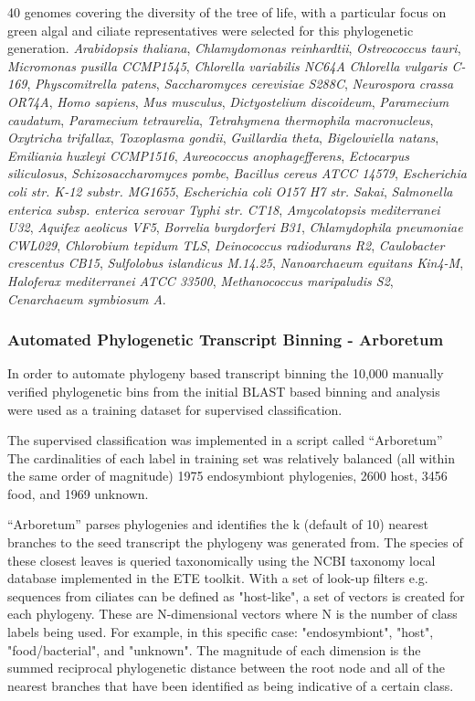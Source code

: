 40 genomes covering the diversity of the tree of life, with a particular focus on green algal and ciliate representatives 
were selected for this phylogenetic generation.
\textit{Arabidopsis thaliana}, \textit{Chlamydomonas reinhardtii},
\textit{Ostreococcus tauri}, \textit{Micromonas pusilla CCMP1545},  \textit{Chlorella variabilis NC64A}
\textit{Chlorella vulgaris C-169}, \textit{Physcomitrella patens}, \textit{Saccharomyces cerevisiae S288C}, 
\textit{Neurospora crassa OR74A},
\textit{Homo sapiens},
\textit{Mus musculus},
\textit{Dictyostelium discoideum},
\textit{Paramecium caudatum},
\textit{Paramecium tetraurelia},
\textit{Tetrahymena thermophila macronucleus},
\textit{Oxytricha trifallax},
\textit{Toxoplasma gondii},
\textit{Guillardia theta},
\textit{Bigelowiella natans},
\textit{Emiliania huxleyi CCMP1516},
\textit{Aureococcus anophagefferens},
\textit{Ectocarpus siliculosus},
\textit{Schizosaccharomyces pombe},
\textit{Bacillus cereus ATCC 14579},
\textit{Escherichia coli str. K-12 substr. MG1655},
\textit{Escherichia coli O157 H7 str. Sakai},
\textit{Salmonella enterica subsp. enterica serovar Typhi str. CT18},
\textit{Amycolatopsis mediterranei U32},
\textit{Aquifex aeolicus VF5},
\textit{Borrelia burgdorferi B31},
\textit{Chlamydophila pneumoniae CWL029},
\textit{Chlorobium tepidum TLS},
\textit{Deinococcus radiodurans R2},
\textit{Caulobacter crescentus CB15},
\textit{Sulfolobus islandicus M.14.25},
\textit{Nanoarchaeum equitans Kin4-M},
\textit{Haloferax mediterranei ATCC 33500},
\textit{Methanococcus maripaludis S2},
\textit{Cenarchaeum symbiosum A}.

\subsubsection{Automated Phylogenetic Transcript Binning - Arboretum}
In order to automate phylogeny based transcript binning the 10,000
manually verified phylogenetic bins from the initial BLAST based binning
and analysis were used as a training dataset for supervised classification.

The supervised classification was implemented in a script called ``Arboretum''
The cardinalities of each label in training set was relatively balanced (all within
the same order of magnitude) 1975 endosymbiont phylogenies, 2600 host, 3456 food, and 1969
unknown. 

``Arboretum'' parses phylogenies and identifies the k (default of 10) nearest branches to the seed transcript
the phylogeny was generated from.  The species of these closest leaves is queried taxonomically using the
NCBI taxonomy local database implemented in the ETE toolkit.  With a set of look-up filters e.g.
sequences from ciliates can be defined as "host-like", a set of vectors is created for each phylogeny.  
These are N-dimensional vectors where N is the number of class labels being used. 
For example, in this specific case: "endosymbiont", "host", "food/bacterial", and "unknown".
The magnitude of each dimension is the summed reciprocal phylogenetic distance between the root node and all
of the nearest branches that have been identified as being indicative of a certain class.

